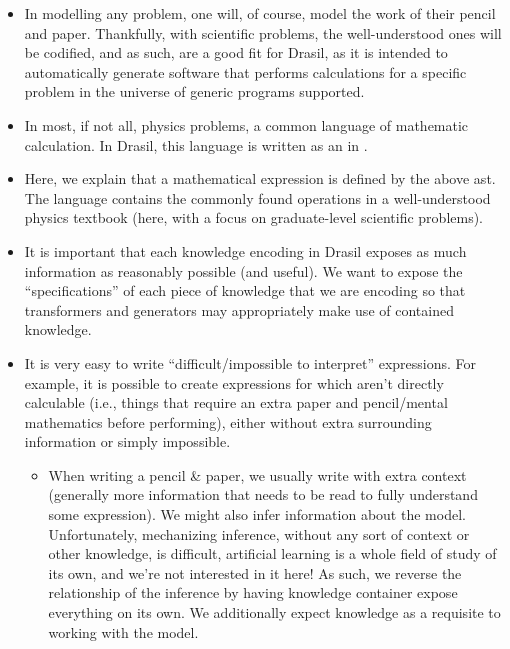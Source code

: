 \begin{itemize}

	\item In modelling any problem, one will, of course, model the work of their
	      pencil and paper. Thankfully, with scientific problems, the
	      well-understood ones will be codified\cite{well-understood}, and as
	      such, are a good fit for Drasil, as it is intended to automatically
	      generate software that performs calculations for a specific problem in
	      the universe of generic programs supported.

	\item In most, if not all, physics problems, a common language of mathematic
	      calculation. In Drasil, this language is written as an  in
	      .

	\item Here, we explain that a mathematical expression is defined by the
	      above \acf{ast}. The language contains the commonly found operations
	      in a well-understood physics textbook (here, with a focus on
	      graduate-level scientific problems).

	\item It is important that each knowledge encoding in Drasil exposes as much
	      information as reasonably possible (and useful). We want to expose the
	      ``specifications'' of each piece of knowledge that we are encoding so
	      that transformers and generators may appropriately make use of
	      contained knowledge.

	\item It is very easy to write ``difficult/impossible to interpret''
	      expressions. For example, it is possible to create expressions for
	      which aren't directly calculable (i.e., things that require an extra
	      paper and pencil/mental mathematics before performing), either without
	      extra surrounding information or simply impossible.

	      \begin{itemize}

		      \item When writing a pencil \& paper, we usually write with extra
		            context (generally more information that needs to be read to
		            fully understand some expression). We might also infer
		            information about the model. Unfortunately, mechanizing
		            inference, without any sort of context or other knowledge,
		            is difficult, artificial learning is a whole field of study
		            of its own, and we're not interested in it here! As such, we
		            reverse the relationship of the inference by having
		            knowledge container expose everything on its own. We
		            additionally expect knowledge as a requisite to working with
		            the model.


\end{itemize}
\end{itemize}
